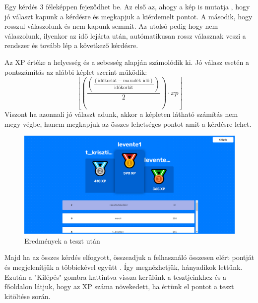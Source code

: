 Egy kérdés 3 féleképpen fejeződhet be. Az első az, ahogy a kép is mutatja , hogy jó választ kapunk a kérdésre és megkapjuk a kiérdemelt pontot. A második, hogy rosszul válaszolunk és nem kapunk semmit. Az utolsó pedig hogy nem válaszolunk, ilyenkor az idő lejárta után, autómatikusan rossz válasznak veszi a rendszer és tovább lép a következő kérdésre. \newline

Az XP értéke a helyesség és a sebesség alapján számolódik ki.
Jó válasz esetén a pontszámítás az alábbi képlet szerint működik:
\[ \left\lfloor\left(\frac{\left(\frac{\left( \text{időkorlát} - \text{maradék idő}\right)}{ \text{időkorlát}}\right)}{2}\right)\cdot xp\right\rfloor \]
Viszont ha azonnali jó választ adunk, akkor a képleten látható számítás nem megy végbe, hanem megkapjuk az összes lehetséges pontot amit a kérdésre lehet.


\begin{figure}[H]
    \centering
    \includegraphics[width=\linewidth]{images/results.png}
    \caption{Eredmények a teszt után}
    \label{fig:results}
\end{figure}

Majd ha az összes kérdés elfogyott, összeadjuk a felhasználó összesen elért pontját és megjelenítjük a többiekével együtt . Így megnézhetjük, hányadikok lettünk. Ezután a "Kilépés" gombra kattintva vissza kerülünk a tesztjeinkhez és a főoldalon látjuk, hogy az XP száma növekedett, ha értünk el pontot a teszt kitöltése során.